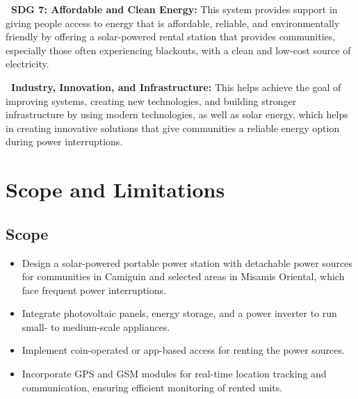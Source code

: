 {\vspace{0.6em} 
\addtocounter{subsection}{1}
\noindent\textbf{\thesubsection\ SDG 7: Affordable and Clean Energy:} 
This system provides support in giving people access to energy that is affordable, reliable, and environmentally friendly by offering a solar-powered rental station that provides communities, especially those often experiencing blackouts, with a clean and low-cost source of electricity.

\vspace{0.6em} 
\addtocounter{subsection}{1}
\noindent\textbf{\thesubsection\ Industry, Innovation, and Infrastructure:} 
 This helps achieve the goal of improving systems, creating new technologies, and building stronger infrastructure by using modern technologies, as well as solar energy, which helps in creating innovative solutions that give communities a reliable energy option during power interruptions.


\section{Scope and Limitations}

\subsection{Scope}
	\begin{itemize}
		\item Design a solar-powered portable power station with detachable power sources for communities in Camiguin and selected areas in Misamis Oriental, which face frequent power interruptions.
		\item Integrate photovoltaic panels, energy storage, and a power inverter to run small- to medium-scale appliances.
		\item Implement coin-operated or app-based access for renting the power sources.
		\item Incorporate GPS and GSM modules for real-time location tracking and communication, ensuring efficient monitoring of rented units.
\end{itemize}

}
